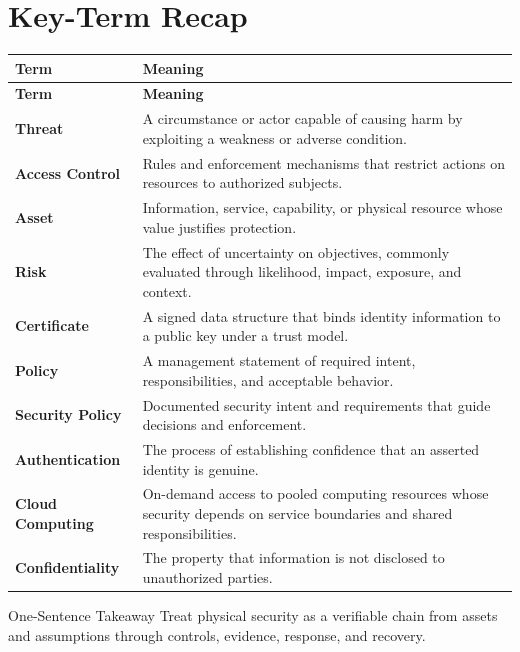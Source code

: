 \documentclass[11pt,letterpaper]{article}
\begin{document}
\section*{Key-Term Recap}
\begin{longtable}{>{\raggedright\arraybackslash}p{}>{\raggedright\arraybackslash}p{}}
\toprule\rowcolor{Navy}\color{white}\textbf{Term} & \color{white}\textbf{Meaning}\\\midrule
\endfirsthead
\toprule\rowcolor{Navy}\color{white}\textbf{Term} & \color{white}\textbf{Meaning}\\\midrule
\endhead
\textbf{Threat} & A circumstance or actor capable of causing harm by exploiting a weakness or adverse condition. \\\midrule
\textbf{Access Control} & Rules and enforcement mechanisms that restrict actions on resources to authorized subjects. \\\midrule
\textbf{Asset} & Information, service, capability, or physical resource whose value justifies protection. \\\midrule
\textbf{Risk} & The effect of uncertainty on objectives, commonly evaluated through likelihood, impact, exposure, and context. \\\midrule
\textbf{Certificate} & A signed data structure that binds identity information to a public key under a trust model. \\\midrule
\textbf{Policy} & A management statement of required intent, responsibilities, and acceptable behavior. \\\midrule
\textbf{Security Policy} & Documented security intent and requirements that guide decisions and enforcement. \\\midrule
\textbf{Authentication} & The process of establishing confidence that an asserted identity is genuine. \\\midrule
\textbf{Cloud Computing} & On-demand access to pooled computing resources whose security depends on service boundaries and shared responsibilities. \\\midrule
\textbf{Confidentiality} & The property that information is not disclosed to unauthorized parties. \\\midrule
\bottomrule
\end{longtable}
\begin{CornellExamBox}{One-Sentence Takeaway}
Treat physical security as a verifiable chain from assets and assumptions through controls, evidence, response, and recovery.
\end{CornellExamBox}
\end{document}
